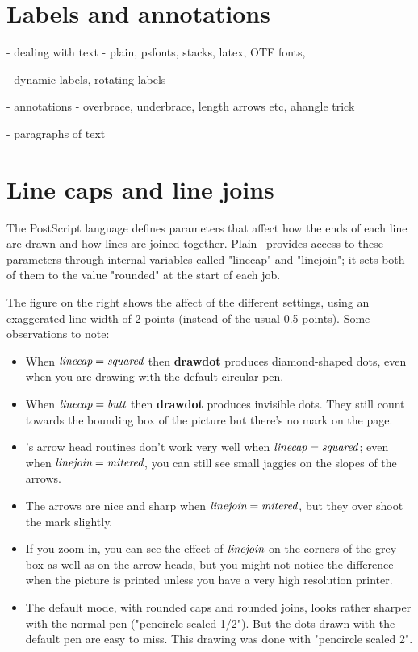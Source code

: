 \documentclass[a4paper,landscape]{article}
\def\kw#1{\begingroup\def\_{\kern.04em
    \vbox{\hrule width.3em height .6pt}\kern.08em}%
\ifmmode\mathop{\textbf{#1}}\else\hbox{\bf#1\/}\fi\endgroup}
\def\id#1{\begingroup\def\_{\kern.04em
    \vbox{\hrule width.3em height .6pt}\kern.08em}%
\ifmmode\mathop{\textit{#1}}\else\hbox{\it#1\/}\fi\endgroup}
\def\mpic#1#2{\vadjust{\moveright5.5in\vbox to 0pt{\vskip#1\texttt{[image: \#2]}\vss}}}
\begin{document}
\newpage
\section{Labels and annotations}

- dealing with text - plain, psfonts, stacks, latex, OTF fonts, 

- dynamic labels, rotating labels

- annotations - overbrace, underbrace, length arrows etc, ahangle trick

- paragraphs of text

\newpage
\section{Line caps and line joins}

The PostScript language defines parameters that affect how the ends of each line are
drawn and how lines are joined together.  Plain \MP\ provides access to these
parameters through internal variables called "linecap" and "linejoin"; it sets both
of them to the value "rounded" at the start of each job. 
\mpic{0pt}{basic_drawing1}

The figure on the right shows the affect of the different settings, using an
exaggerated line width of 2 points (instead of the usual 0.5 points).  Some
observations
to note:
\begin{itemize}
    \item When $\id{linecap}=\id{squared}$ then \kw{drawdot} produces diamond-shaped
        dots, even when you are drawing with the default circular pen. 

    \item When $\id{linecap}=\id{butt}$ then \kw{drawdot} produces invisible dots.
        They still count towards the bounding box of the picture but there's no mark
        on the page.

    \item \MP's arrow head routines don't work very well when $\id{linecap}=\id{squared}$;
        even when $\id{linejoin}=\id{mitered}$, you can still see small jaggies on
        the slopes of the arrows.

    \item The arrows are nice and sharp when 
        $\id{linejoin}=\id{mitered}$, but they over shoot the mark slightly.

    \item If you zoom in, you can see the effect of $\id{linejoin}$ on the corners of the grey box
        as well as on the arrow heads, but you might not notice the difference when
        the picture is printed unless you have a very high resolution printer.

    \item The default mode, with rounded caps and rounded joins, looks rather
        sharper with the normal pen ("pencircle scaled 1/2").  But the dots drawn
        with the default pen are easy to miss.  
        This drawing was done with "pencircle scaled 2".  

\end{itemize}
\end{document}
